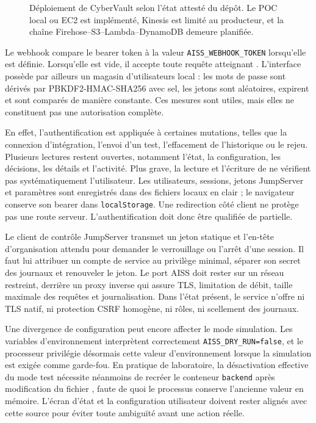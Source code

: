 \documentclass[11pt,a4paper,oneside]{report}
\theoremstyle{definition}
\theoremstyle{plain}
\begin{document}
\begin{figure}[H]
{}
\caption{Déploiement de CyberVault selon l'état attesté du dépôt. Le POC
local ou EC2 est implémenté, Kinesis est limité au producteur, et la chaîne
Firehose--S3--Lambda--DynamoDB demeure planifiée.}
\label{fig:impl-deployment}
\end{figure}

Le webhook compare le bearer token à la valeur
\texttt{AISS\_WEBHOOK\_TOKEN} lorsqu'elle est définie. Lorsqu'elle est vide,
il accepte toute requête atteignant . L'interface possède par
ailleurs un magasin d'utilisateurs local : les mots de passe sont dérivés par
PBKDF2-HMAC-SHA256 avec sel, les jetons sont aléatoires, expirent et sont
comparés de manière constante. Ces mesures sont utiles, mais elles ne
constituent pas une autorisation complète.

En effet, l'authentification est appliquée à certaines mutations, telles que
la connexion d'intégration, l'envoi d'un test, l'effacement de l'historique ou
le rejeu. Plusieurs lectures restent ouvertes, notamment l'état, la
configuration, les décisions, les détails et l'activité. Plus grave, la
lecture et l'écriture de  ne vérifient pas systématiquement
l'utilisateur. Les utilisateurs, sessions, jetons JumpServer et paramètres
sont enregistrés dans des fichiers locaux en clair ; le navigateur conserve
son bearer dans \texttt{localStorage}. Une redirection côté client ne protège
pas une route serveur. L'authentification doit donc être qualifiée de
partielle.

Le client de contrôle JumpServer transmet un jeton statique et l'en-tête
d'organisation attendu pour demander le verrouillage ou l'arrêt d'une
session. Il faut lui attribuer un compte de service au privilège minimal,
séparer son secret des journaux et renouveler le jeton. Le port AISS doit
rester sur un réseau restreint, derrière un proxy inverse qui assure TLS,
limitation de débit, taille maximale des requêtes et journalisation. Dans
l'état présent, le service n'offre ni TLS natif, ni protection CSRF homogène,
ni rôles, ni scellement des journaux.

Une divergence de configuration peut encore affecter le mode simulation. Les
variables d'environnement interprètent correctement
\texttt{AISS\_DRY\_RUN=false}, et le processeur privilégie désormais cette
valeur d'environnement lorsque la simulation est exigée comme garde-fou. En
pratique de laboratoire, la désactivation effective du mode test nécessite
néanmoins de recréer le conteneur \texttt{backend} après modification du
fichier , faute de quoi le processus conserve l'ancienne valeur en
mémoire. L'écran d'état et la configuration utilisateur doivent rester alignés
avec cette source pour éviter toute ambiguïté avant une action réelle.
\end{document}
